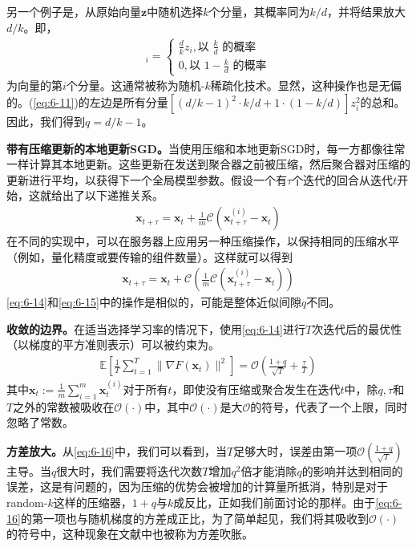 另一个例子是，从原始向量$\bm{z}$中随机选择$k$个分量，其概率同为$k/d$，并将结果放大$d/k$。即，
\begin{align}
	[\mathcal{C}(\bm{z})]_{i} = \left\{ 
	\begin{matrix}
		\frac{d}{k}z_{i}, \text{以 } \frac{k}{d} \text{ 的概率} \\
		0,  \text{以 } 1-\frac{k}{d} \text{ 的概率}
	\end{matrix}
	\right. \label{eq:6-13}
\end{align}
为向量的第$i$个分量。这通常被称为随机-$k$稀疏化技术。显然，这种操作也是无偏的。(\ref{eq:6-11})的左边是所有分量$[(d/k - 1)^{2} \cdot k/d + 1 \cdot (1 - k/d)]z_{i}^{2}$的总和。因此，我们得到$q = d/k - 1$。

\textbf{带有压缩更新的本地更新SGD。}当使用压缩和本地更新SGD时，每一方都像往常一样计算其本地更新。这些更新在发送到聚合器之前被压缩，然后聚合器对压缩的更新进行平均，以获得下一个全局模型参数。假设一个有$\tau$个迭代的回合从迭代$t$开始，这就给出了以下递推关系。
\begin{align}\label{eq:6-14}
	\bm{x}_{t+\tau} = \bm{x}_{t} + \frac{1}{m}\mathcal{C}(\bm{x}_{t+\tau}^{(i)} - \bm{x}_{t})
\end{align}
在不同的实现中，可以在服务器上应用另一种压缩操作，以保持相同的压缩水平（例如，量化精度或要传输的组件数量）。这样就可以得到
\begin{align}\label{eq:6-15}
	\bm{x}_{t+\tau} = \bm{x}_{t} + \mathcal{C}(\frac{1}{m}\mathcal{C}(\bm{x}_{t+\tau}^{(i)} - \bm{x}_{t}))
\end{align}
\ref{eq:6-14}和\ref{eq:6-15}中的操作是相似的，可能是整体近似间隙$q$不同。

\textbf{收敛的边界。}在适当选择学习率的情况下，使用\ref{eq:6-14}进行$T$次迭代后的最优性（以梯度的平方准则表示）可以被约束为。
\begin{align}\label{eq:6-16}
	\mathbb{E}[\frac{1}{T}\sum_{t=1}^{T}\|\nabla F(\bm{x}_{t})\|^{2}] = \mathcal{O}(\frac{1+q}{\sqrt{T}} + \frac{\tau}{T})
\end{align}
其中$\bm{x}_{t}:=\frac{1}{m}\sum_{i=1}^{m}\bm{x}_{t}^{(i)}$对于所有$t$，即使没有压缩或聚合发生在迭代$t$中，除$q,τ$和$T$之外的常数被吸收在$\mathcal{O}(\cdot)$中，其中$\mathcal{O}(\cdot)$是大$\mathcal{O}$的符号，代表了一个上限，同时忽略了常数。

\textbf{方差放大。}从\ref{eq:6-16}中，我们可以看到，当$T$足够大时，误差由第一项$\mathcal{O}(\frac{1+q}{\sqrt{T}})$主导。当$q$很大时，我们需要将迭代次数$T$增加$q^{2}$倍才能消除$q$的影响并达到相同的误差，这是有问题的，因为压缩的优势会被增加的计算量所抵消，特别是对于random-$k$这样的压缩器，$1+q$与$k$成反比，正如我们前面讨论的那样。由于\ref{eq:6-16}的第一项也与随机梯度的方差成正比，为了简单起见，我们将其吸收到$\mathcal{O}(\cdot)$的符号中，这种现象在文献中也被称为方差吹胀。


